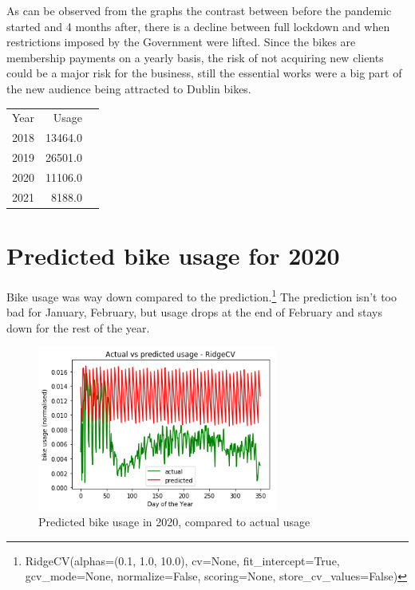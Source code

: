 \documentclass[11pt, singlecolumn, citestyle=authoryear]{elegantbook}
\begin{document}
As can be observed from the graphs the contrast between before the pandemic started and 4 months after, there is a decline between full lockdown and when restrictions imposed by the Government were lifted. Since the bikes are membership payments on a yearly basis, the risk of not acquiring new clients could be a major risk for the business, still the essential works were a big part of the new audience being attracted to Dublin bikes. 

\begin{table}[h!]
	\begin{tabular}{|l|r|r|}
		Year & Usage \\
		2018 & 13464.0 \\
		2019 & 26501.0 \\ 
		2020 & 11106.0 \\ 
		2021 & 8188.0 \\ 
		
	\end{tabular} 
\end{table}



\section{Predicted bike usage for 2020}

Bike usage was way down compared to the prediction.\footnote{RidgeCV(alphas=(0.1, 1.0, 10.0), cv=None, fit\_intercept=True, gcv\_mode=None, normalize=False, scoring=None, store\_cv\_values=False)}  
The prediction isn't too bad for January, February, but usage drops at the end of February and stays down for the rest of the year.
\begin{figure}[!htbp]
	\includegraphics[width=0.7\textwidth]{../graphs/pred_2020.png}
	\caption{Predicted bike usage in 2020, compared to actual usage}
	\label{fig:surface}
\end{figure}
\end{document}
